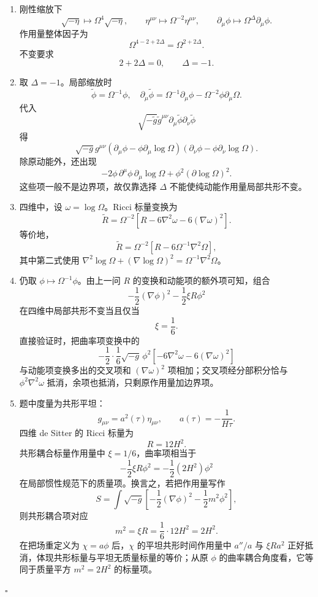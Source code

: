 \documentclass[UTF8,12pt]{ctexart}
\newenvironment{solution}{%
  \par\medskip
  \noindent{\bfseries 解答}\quad\ignorespaces
}{\hfill$\square$\par\medskip}
\begin{document}
\begin{solution}
\begin{enumerate}[label=(\arabic*)]
\item 刚性缩放下
\[
\sqrt{-\eta}\mapsto\Omega^4\sqrt{-\eta},\qquad
\eta^{\mu\nu}\mapsto\Omega^{-2}\eta^{\mu\nu},\qquad
\partial_\mu\phi\mapsto\Omega^\Delta\partial_\mu\phi.
\]
作用量整体因子为
\[
\Omega^{4-2+2\Delta}=\Omega^{2+2\Delta}.
\]
不变要求
\[
2+2\Delta=0,\qquad \Delta=-1.
\]

\item 取 \(\Delta=-1\)。局部缩放时
\[
\tilde\phi=\Omega^{-1}\phi,
\quad
\partial_\mu\tilde\phi
=\Omega^{-1}\partial_\mu\phi-\Omega^{-2}\phi\partial_\mu\Omega.
\]
代入
\[
\sqrt{-\tilde g}\tilde g^{\mu\nu}\partial_\mu\tilde\phi\partial_\nu\tilde\phi
\]
得
\[
\sqrt{-g}g^{\mu\nu}
\left(\partial_\mu\phi-\phi\partial_\mu\log\Omega\right)
\left(\partial_\nu\phi-\phi\partial_\nu\log\Omega\right).
\]
除原动能外，还出现
\[
-2\phi\,\partial^\mu\phi\,\partial_\mu\log\Omega
+\phi^2(\partial\log\Omega)^2.
\]
这些项一般不是边界项，故仅靠选择 \(\Delta\) 不能使纯动能作用量局部共形不变。

\item 四维中，设 \(\omega=\log\Omega\)。Ricci 标量变换为
\[
\tilde R=\Omega^{-2}\left[
R-6\nabla^2\omega-6(\nabla\omega)^2
\right].
\]
等价地，
\[
\tilde R=\Omega^{-2}\left[
R-6\Omega^{-1}\nabla^2\Omega
\right],
\]
其中第二式使用
\(\nabla^2\log\Omega+(\nabla\log\Omega)^2=\Omega^{-1}\nabla^2\Omega\)。

\item 仍取 \(\phi\mapsto\Omega^{-1}\phi\)。由上一问 \(R\) 的变换和动能项的额外项可知，组合
\[
-\frac12(\nabla\phi)^2-\frac12\xi R\phi^2
\]
在四维中局部共形不变当且仅当
\[
\xi=\frac16.
\]
直接验证时，把曲率项变换中的
\[
-\frac12\cdot\frac16\sqrt{-g}\,\phi^2[-6\nabla^2\omega-6(\nabla\omega)^2]
\]
与动能项变换多出的交叉项和 \((\nabla\omega)^2\) 项相加；交叉项经分部积分恰与 \(\phi^2\nabla^2\omega\) 抵消，余项也抵消，只剩原作用量加边界项。

\item 题中度量为共形平坦：
\[
g_{\mu\nu}=a^2(\tau)\eta_{\mu\nu},\qquad
a(\tau)=-\frac1{H\tau}.
\]
四维 de Sitter 的 Ricci 标量为
\[
R=12H^2.
\]
共形耦合标量作用量中 \(\xi=1/6\)，曲率项相当于
\[
-\frac12\xi R\phi^2=-\frac12(2H^2)\phi^2
\]
在局部惯性规范下的质量项。换言之，若把作用量写作
\[
S=\int\sqrt{-g}\left[-\frac12(\nabla\phi)^2-\frac12m^2\phi^2\right],
\]
则共形耦合项对应
\[
m^2=\xi R=\frac16\cdot12H^2=2H^2.
\]
在把场重定义为 \(\chi=a\phi\) 后，\(\chi\) 的平坦共形时间作用量中 \(a''/a\) 与 \(\xi R a^2\) 正好抵消，体现共形标量与平坦无质量标量的等价；从原 \(\phi\) 的曲率耦合角度看，它等同于质量平方 \(m^2=2H^2\) 的标量项。
\end{enumerate}
\end{solution}
\end{document}
